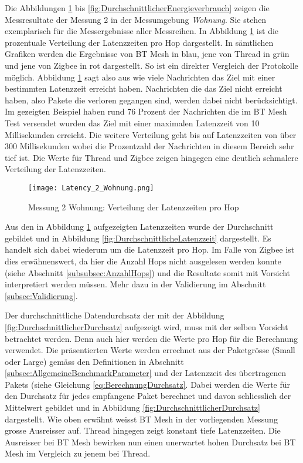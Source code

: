 Die Abbildungen \ref{fig:VerteilungderLatenzzeiten} bis \ref{fig:DurchschnittlicherEnergieverbrauch} zeigen die Messresultate der Messung 2 in der Messumgebung \textit{Wohnung}. Sie stehen exemplarisch für die Messergebnisse aller Messreihen.
In Abbildung \ref{fig:VerteilungderLatenzzeiten} ist die prozentuale Verteilung der Latenzzeiten pro Hop dargestellt.
In sämtlichen Grafiken werden die Ergebnisse von BT Mesh in blau, jene von Thread in grün und jene von Zigbee in rot dargestellt.
So ist ein direkter Vergleich der Protokolle möglich.
Abbildung \ref{fig:VerteilungderLatenzzeiten} sagt also aus wie viele Nachrichten das Ziel mit einer bestimmten Latenzzeit erreicht haben.
Nachrichten die das Ziel nicht erreicht haben, also Pakete die verloren gegangen sind, werden dabei nicht berücksichtigt.
Im gezeigten Beispiel haben rund 76 Prozent der Nachrichten die im BT Mesh Test versendet wurden das Ziel mit einer maximalen Latenzzeit von 10 Millisekunden erreicht.
Die weitere Verteilung geht bis auf Latenzzeiten von über 300 Millisekunden wobei die Prozentzahl der Nachrichten in diesem Bereich sehr tief ist.
Die Werte für Thread und Zigbee zeigen hingegen eine deutlich schmalere Verteilung der Latenzzeiten.

\begin{figure}[h]
	\centering
	\texttt{[image: Latency\_2\_Wohnung.png]}
	\caption{Messung 2 Wohnung: Verteilung der Latenzzeiten pro Hop}
	\label{fig:VerteilungderLatenzzeiten}
\end{figure}

Aus den in Abbildung \ref{fig:VerteilungderLatenzzeiten} aufgezeigten Latenzzeiten wurde der Durchschnitt gebildet und in Abbildung \ref{fig:DurchschnittlicheLatenzzeit} dargestellt.
Es handelt sich dabei wiederum um die Latenzzeit pro Hop. Im Falle von Zigbee ist dies erwähnenswert, da hier die Anzahl Hops nicht ausgelesen werden konnte (siehe Abschnitt \ref{subsubsec:AnzahlHops}) und die Resultate somit mit Vorsicht interpretiert werden müssen. Mehr dazu in der Validierung im Abschnitt \ref{subsec:Validierung}.

Der durchschnittliche Datendurchsatz der mit der Abbildung \ref{fig:DurchschnittlicherDurchsatz} aufgezeigt wird, muss mit der selben Vorsicht betrachtet werden. Denn auch hier werden die Werte pro Hop für die Berechnung verwendet.
Die präsentierten Werte werden errechnet aus der Paketgrösse (Small oder Large) gemäss den Definitionen in Abschnitt \ref{subsec:AllgemeineBenchmarkParameter} und der Latenzzeit des übertragenen Pakets (siehe Gleichung \ref{eq:BerechnungDurchsatz}.
Dabei werden die Werte für den Durchsatz für jedes empfangene Paket berechnet und davon schliesslich der Mittelwert gebildet und in Abbildung \ref{fig:DurchschnittlicherDurchsatz} dargestellt.
Wie oben erwähnt weisst BT Mesh in der vorliegenden Messung grosse Ausreisser auf.
Thread hingegen zeigt konstant tiefe Latenzzeiten.
Die Ausreisser bei BT Mesh bewirken nun einen unerwartet hohen Durchsatz bei BT Mesh im Vergleich zu jenem bei Thread.

